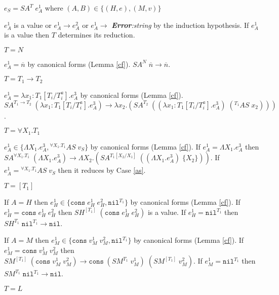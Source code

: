 \begin{case}
$e_{S}=SA^{T}\;e_{A}^{1}$ where $(A,B)\in\lbrace(H,e),(M,v)\rbrace$

$e_{A}^{1}$ is a value or $e_{A}^{1}\rightarrow e_{A}^{2}$ or $e_{A}^{1}\rightarrow$ \emph{\textbf{Error}:\;string} by the induction hypothesis.  If $e_{A}^{1}$ is a value then $T$ determines its reduction.
\begin{subcase}
$T=N$

$e_{A}^{1}=\overline{n}$ by canonical forms (Lemma \ref{cf}).  $SA^{N}\;\overline{n}\rightarrow\overline{n}$.
\end{subcase}
\begin{subcase}
$T=T_{1}\rightarrow T_{2}$

$e_{A}^{1}=\lambda x_{1}:T_{1}[T_{i}/T_{i}^{a}].e_{A}^{3}$ by canonical forms (Lemma \ref{cf}).  $SA^{T_{1}\rightarrow T_{2}}\;(\lambda x_{1}:T_{1}[T_{i}/T_{i}^{a}].e_{A}^{3})\rightarrow\lambda x_{2}.(SA^{T_{2}}\;((\lambda x_{1}:T_{1}[T_{i}/T_{i}^{a}].e_{A}^{3})\;(^{T_{1}}AS\;x_{2})))$.
\end{subcase}
\begin{subcase}
$T=\forall X_{1}.T_{1}$

$e_{A}^{1}\in\lbrace\Lambda X_{1}.e_{A}^{3},{^{\forall X_{1}.T_{1}}A}S\;v_{S}\rbrace$ by canonical forms (Lemma \ref{cf}).  If $e_{A}^{1}=\Lambda X_{1}.e_{A}^{3}$ then $SA^{\forall X_{1}.T_{1}}\;(\Lambda X_{1}.e_{A}^{3})\rightarrow\Lambda X_{2}.(SA^{T_{1}[X_{2}/X_{1}]}\;((\Lambda X_{1}.e_{A}^{3})\;\lbrace X_{2}\rbrace))$.  If $e_{A}^{1}={^{\forall X_{1}.T_{1}}A}S\;v_{S}$ then it reduces by Case \ref{as}.
\end{subcase}
\begin{subcase}
$T=[T_{1}]$

If $A=H$ then $e_{H}^{1}\in\lbrace\mathtt{cons}\;e_{H}^{1}\;e_{H}^{2},\mathtt{nil}^{T_{1}}\rbrace$ by canonical forms (Lemma \ref{cf}).  If $e_{H}^{1}=\mathtt{cons}\;e_{H}^{1}\;e_{H}^{2}$ then $SH^{[T_{1}]}\;(\mathtt{cons}\;e_{H}^{1}\;e_{H}^{2})$ is a value.  If $e_{H}^{1}=\mathtt{nil}^{T_{1}}$ then $SH^{T_{1}}\;\mathtt{nil}^{T_{1}}\rightarrow\mathtt{nil}$.

If $A=M$ then $e_{M}^{1}\in\lbrace\mathtt{cons}\;v_{M}^{1}\;v_{M}^{2},\mathtt{nil}^{T_{1}}\rbrace$ by canonical forms (Lemma \ref{cf}).  If $e_{M}^{1}=\mathtt{cons}\;v_{M}^{1}\;v_{M}^{2}$ then $SM^{[T_{1}]}\;(\mathtt{cons}\;v_{M}^{1}\;v_{M}^{2})\rightarrow\mathtt{cons}\;(SM^{T_{1}}\;v_{M}^{1})\;(SM^{[T_{1}]}\;v_{M}^{2})$.  If $e_{M}^{1}=\mathtt{nil}^{T_{1}}$ then $SM^{T_{1}}\;\mathtt{nil}^{T_{1}}\rightarrow\mathtt{nil}$.
\end{subcase}
\begin{subcase}
$T=L$


\end{subcase}
\end{case}
